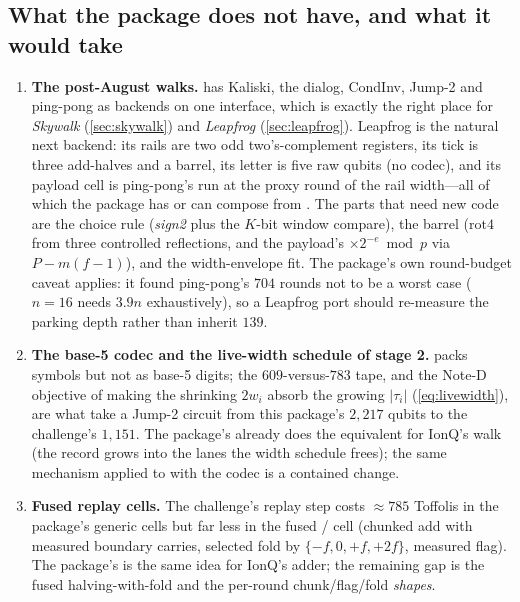 \subsection{What the package does not have, and what it would take}

\begin{enumerate}[leftmargin=*]
\item \textbf{The post-August walks.}  has Kaliski, the dialog, CondInv, Jump-2 and ping-pong as backends on one  interface, which is exactly the right place for \emph{Skywalk} (\cref{sec:skywalk}) and \emph{Leapfrog} (\cref{sec:leapfrog}). Leapfrog is the natural next backend: its rails are two odd two's-complement registers, its tick is three add-halves and a barrel, its letter is five raw qubits (no codec), and its payload cell is ping-pong's  run at the proxy round of the rail width---all of which the package has or can compose from . The parts that need new code are the choice rule (\emph{sign2} plus the $K$-bit window compare), the barrel ($\mathrm{rot4}$ from three controlled reflections, and the payload's $\times2^{-e}\bmod p$ via $P-m(f-1)$), and the width-envelope fit. The package's own round-budget caveat applies: it found ping-pong's $704$ rounds not to be a worst case ($n=16$ needs $3.9n$ exhaustively), so a Leapfrog port should re-measure the parking depth rather than inherit $139$.
\item \textbf{The base-5 codec and the live-width schedule of stage 2.}  packs symbols but not as base-5 digits; the $609$-versus-$783$ tape, and the Note-D objective of making the shrinking $2w_i$ absorb the growing $|\tau_i|$ (\cref{eq:livewidth}), are what take a Jump-2 circuit from this package's $2{,}217$ qubits to the challenge's $1{,}151$. The package's  already does the equivalent for IonQ's walk (the record grows into the lanes the width schedule frees); the same mechanism applied to  with the codec is a contained change.
\item \textbf{Fused replay cells.} The challenge's replay step costs $\approx785$ Toffolis in the package's generic cells but far less in the fused / cell (chunked add with measured boundary carries, selected fold by $\{-f,0,+f,+2f\}$, measured flag). The package's  is the same idea for IonQ's adder; the remaining gap is the fused halving-with-fold and the per-round chunk/flag/fold \emph{shapes}.

\end{enumerate}
